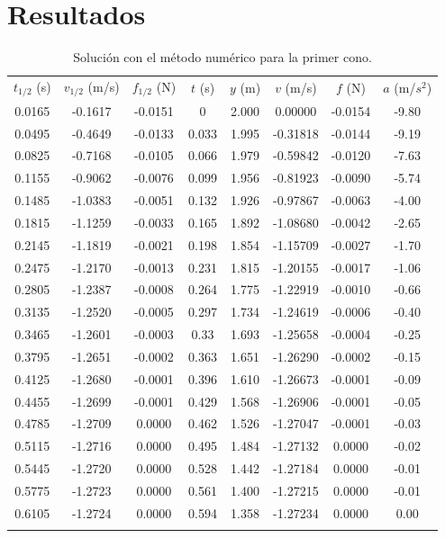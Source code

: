 \section{Resultados}

\begin{longtable}{|c|c|c|c|c|c|c|c|}
    \hline
    \rowcolor{azulito}\multicolumn{8}{|c|}{Cono 1} \\
    \hline
    \rowcolor{azulito} $t_{1/2}$ (s) & $v_{1/2}$ (m/s) & $f_{1/2} $ (N)& $t$ (s)& $y$ (m)& $v$ (m/s)& $f$ (N)& $a$ (m/$s^2$)\\
    \endhead
    \hline 0.0165 & -0.1617 & -0.0151 & 0 & 2.000 & 0.00000 & -0.0154 & -9.80 \\
    \hline 0.0495 & -0.4649 & -0.0133 & 0.033 & 1.995 & -0.31818 & -0.0144 & -9.19 \\
    \hline 0.0825 & -0.7168 & -0.0105 & 0.066 & 1.979 & -0.59842 & -0.0120 & -7.63 \\
    \hline 0.1155 & -0.9062 & -0.0076 & 0.099 & 1.956 & -0.81923 & -0.0090 & -5.74 \\
    \hline 0.1485 & -1.0383 & -0.0051 & 0.132 & 1.926 & -0.97867 & -0.0063 & -4.00 \\
    \hline 0.1815 & -1.1259 & -0.0033 & 0.165 & 1.892 & -1.08680 & -0.0042 & -2.65 \\
    \hline 0.2145 & -1.1819 & -0.0021 & 0.198 & 1.854 & -1.15709 & -0.0027 & -1.70 \\
    \hline 0.2475 & -1.2170 & -0.0013 & 0.231 & 1.815 & -1.20155 & -0.0017 & -1.06 \\
    \hline 0.2805 & -1.2387 & -0.0008 & 0.264 & 1.775 & -1.22919 & -0.0010 & -0.66 \\
    \hline 0.3135 & -1.2520 & -0.0005 & 0.297 & 1.734 & -1.24619 & -0.0006 & -0.40 \\
    \hline 0.3465 & -1.2601 & -0.0003 & 0.33 & 1.693 & -1.25658 & -0.0004 & -0.25 \\
    \hline 0.3795 & -1.2651 & -0.0002 & 0.363 & 1.651 & -1.26290 & -0.0002 & -0.15 \\
    \hline 0.4125 & -1.2680 & -0.0001 & 0.396 & 1.610 & -1.26673 & -0.0001 & -0.09 \\
    \hline 0.4455 & -1.2699 & -0.0001 & 0.429 & 1.568 & -1.26906 & -0.0001 & -0.05 \\
    \hline 0.4785 & -1.2709 & 0.0000 & 0.462 & 1.526 & -1.27047 & -0.0001 & -0.03 \\
    \hline 0.5115 & -1.2716 & 0.0000 & 0.495 & 1.484 & -1.27132 & 0.0000 & -0.02 \\
    \hline 0.5445 & -1.2720 & 0.0000 & 0.528 & 1.442 & -1.27184 & 0.0000 & -0.01 \\
    \hline 0.5775 & -1.2723 & 0.0000 & 0.561 & 1.400 & -1.27215 & 0.0000 & -0.01 \\
    \hline 0.6105 & -1.2724 & 0.0000 & 0.594 & 1.358 & -1.27234 & 0.0000 & 0.00 \\
    \hline
    \caption{Solución con el método numérico
    para la primer cono.}
    \label{tab:Cono1Euler}
\end{longtable}
